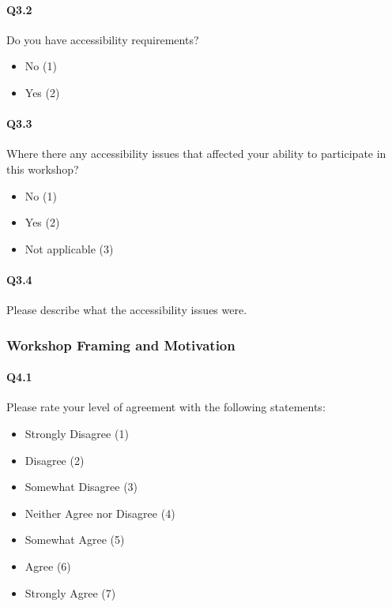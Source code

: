 \documentclass[030-workshop.tex]{subfiles}
\begin{document}
    \paragraph{Q3.2}

        Do you have accessibility requirements?

        \begin{itemize}
            \item No  (1)
            \item Yes  (2)
        \end{itemize}

    \paragraph{Q3.3}

        Where there any accessibility issues that affected your ability to participate in this workshop?

        \begin{itemize}
            \item No  (1)
            \item Yes  (2)
            \item Not applicable  (3)
        \end{itemize}


    \paragraph{Q3.4}

        Please describe what the accessibility issues were.

\subsubsection{Workshop Framing and Motivation}

    \paragraph{Q4.1}

        Please rate your level of agreement with the following statements:

        \begin{itemize}
            \item Strongly Disagree (1)
            \item Disagree (2)
            \item Somewhat Disagree (3)
            \item Neither Agree nor Disagree (4)
            \item Somewhat Agree (5)
            \item Agree (6)
            \item Strongly Agree (7)
        \end{itemize}
\end{document}
